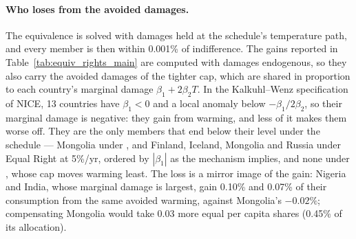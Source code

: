 \documentclass[12pt,english]{article}
\theoremstyle{remark}
\providecommand{\DIFaddtex}[1]{{\protect\color{blue}\uwave{#1}}} %
\providecommand{\DIFdeltex}[1]{{\protect\color{red}\sout{#1}}}                      %
\providecommand{\DIFaddbegin}{} %
\providecommand{\DIFaddend}{} %
\providecommand{\DIFdelbegin}{} %
\providecommand{\DIFdelend}{} %
\providecommand{\DIFadd}[1]{\texorpdfstring{\DIFaddtex{#1}}{#1}} %
\providecommand{\DIFdel}[1]{\texorpdfstring{\DIFdeltex{#1}}{}} %
\newcommand{\DIFscaledelfig}{0.5}
\newlength{\DIFdelgraphicswidth} %
\newlength{\DIFdelgraphicsheight} %
\newcommand{\DIFaddincludegraphics}[2][]{{\color{blue}\fbox{\DIFOincludegraphics[#1]{#2}}}} %
\newcommand{\DIFdelincludegraphics}[2][]{%
\sbox{\DIFdelgraphicsbox}{\DIFOincludegraphics[#1]{#2}}%
\settoboxwidth{\DIFdelgraphicswidth}{\DIFdelgraphicsbox} %
\settoboxtotalheight{\DIFdelgraphicsheight}{\DIFdelgraphicsbox} %
\scalebox{\DIFscaledelfig}{%
\parbox[b]{\DIFdelgraphicswidth}{\usebox{\DIFdelgraphicsbox}\\[-\baselineskip] \rule{\DIFdelgraphicswidth}{0em}}\llap{\resizebox{\DIFdelgraphicswidth}{\DIFdelgraphicsheight}{%
\setlength{\unitlength}{\DIFdelgraphicswidth}%
\begin{picture}(1,1)%
\thicklines\linethickness{2pt} %
{\color[rgb]{1,0,0}\put(0,0){\framebox(1,1){}}}%
{\color[rgb]{1,0,0}\put(0,0){\line( 1,1){1}}}%
{\color[rgb]{1,0,0}\put(0,1){\line(1,-1){1}}}%
\end{picture}%
}\hspace*{3pt}}} %
} %
\DeclareRobustCommand{\DIFaddbegin}{\DIFOaddbegin \let\includegraphics\DIFaddincludegraphics} %
\DeclareRobustCommand{\DIFaddend}{\DIFOaddend \let\includegraphics\DIFOincludegraphics} %
\DeclareRobustCommand{\DIFdelbegin}{\DIFOdelbegin \let\includegraphics\DIFdelincludegraphics} %
\DeclareRobustCommand{\DIFdelend}{\DIFOaddend \let\includegraphics\DIFOincludegraphics} %
\begin{document}
\paragraph{Who loses from the avoided damages.} The equivalence is solved with damages held at the schedule's temperature path, and every member is then within 0.001\% of indifference. The gains reported in Table~\ref{tab:equiv_rights_main} are computed with damages endogenous, so they also carry the avoided damages of the tighter cap, which are shared in proportion to each country's marginal damage $\beta_1+2\beta_2 T$. In the Kalkuhl--Wenz specification of NICE, 13 countries have $\beta_1<0$ and a local anomaly below \DIFdelbegin \DIFdel{$-\beta_1/2\beta_2$}\DIFdelend \DIFaddbegin \DIFadd{$-\beta_1/(2\beta_2)$}\DIFaddend , so their marginal damage is negative: they gain from warming, and less of it makes them worse off. They are the only members that end below their level under the schedule --- Mongolia under \citet{banerjee_grand_2025}, and Finland, Iceland, Mongolia and Russia under Equal Right at 5\%/yr, ordered by $|\beta_1|$ as the mechanism implies, and none under \citet{wolfram_building_2025}, whose cap moves warming least. The loss is a mirror image of the gain: Nigeria and India, whose marginal damage is largest, gain 0.10\% and 0.07\% of their consumption from the same avoided warming, against Mongolia's $-0.02\%$; compensating Mongolia would take 0.03 more equal per capita shares (0.45\% of its allocation). %

\end{document}
